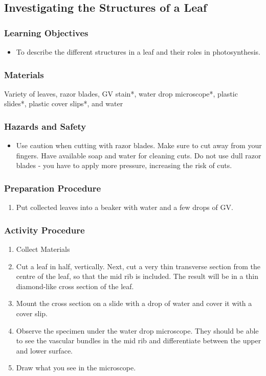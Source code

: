 \subsection{Investigating the Structures of a Leaf}



\subsubsection*{Learning Objectives}
\begin{itemize}
\item{To describe the different structures in a leaf and their roles in photosynthesis.}
\end{itemize}

\subsubsection*{Materials}
Variety of leaves, razor blades, GV stain*, water drop microscope*, plastic slides*, plastic cover slips*, and water

\subsubsection*{Hazards and Safety}
\begin{itemize}
\item{Use caution when cutting with razor blades. Make sure to cut away from your fingers. Have available soap and water for cleaning cuts. Do not use dull razor blades - you have to apply more pressure, increasing the risk of cuts.}
\end{itemize}

\subsubsection*{Preparation Procedure}
\begin{enumerate}
\item{Put collected leaves into a beaker with water and a few drops of GV.}
\end{enumerate}

\subsubsection*{Activity Procedure}
\begin{enumerate}
\item{Collect Materials}
\item{Cut a leaf in half, vertically. Next, cut a very thin transverse section from the centre of the leaf, so that the mid rib is included. The result will be in a thin diamond-like cross section of the leaf.}
\item{Mount the cross section on a slide with a drop of water and cover it with a cover slip.}
\item{Observe the specimen under the water drop microscope. They should be able to see the vascular bundles in the mid rib and differentiate between the upper and lower surface.}
\item{Draw what you see in the microscope.}
\end{enumerate}

